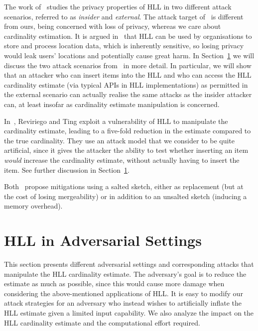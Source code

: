 \documentclass{IEEEtran}
\begin{document}
The work of~\cite{cardestprivacy} studies the privacy properties of HLL in two different attack scenarios, referred to as \emph{insider} and \emph{external}. The attack target of~\cite{cardestprivacy} is different from ours, being concerned with loss of privacy, whereas we care about cardinality estimation. It is argued in~\cite{cardestprivacy} that HLL can be used by organisations to store and process location data, which is inherently sensitive, so losing privacy would leak users' locations and potentially cause great harm. In Section~\ref{sec:attacks} we will discuss the two attack scenarios from~\cite{cardestprivacy} in more detail. In particular, we will show that an attacker who can insert items into the HLL and who can access the HLL cardinality estimate (via typical APIs in HLL implementations) as permitted in the external scenario can actually realise the same attacks as the insider attacker can, at least insofar as cardinality estimate manipulation is concerned.

In~\cite{hllvuln}, Reviriego and Ting exploit a vulnerability of HLL to manipulate the cardinality estimate, leading to a five-fold reduction in the estimate compared to the true cardinality. They use an attack model that we consider to be quite artificial, since it gives the attacker the ability to test whether inserting an item \emph{would} increase the cardinality estimate, without actually having to insert the item. See further discussion in Section~\ref{sec:attacks}.

Both~\cite{cardestprivacy,hllvuln} propose mitigations using a salted sketch, either as replacement (but at the cost of losing mergeability) or in addition to an unsalted sketch (inducing a memory overhead).

\section{HLL in Adversarial Settings}\label{sec:attacks}

This section presents different adversarial settings and corresponding attacks that manipulate the HLL cardinality estimate. The adversary's goal is to reduce the estimate as much as possible, since this would cause more damage when  considering the above-mentioned applications of HLL. It is easy to modify our attack strategies for an adversary who instead wishes to artificially inflate the HLL estimate given a limited input capability. We also analyze the impact on the HLL cardinality estimate and the computational effort required.
\end{document}
